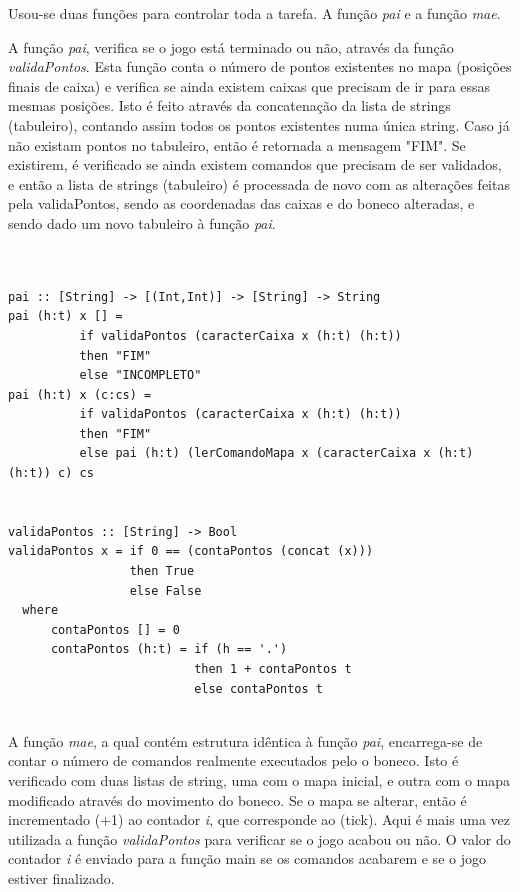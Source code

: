 \documentclass[a4paper]{article}
\begin{document}
Usou-se duas funções para controlar toda a tarefa. A função \textit{pai} e a função \textit{mae}. \par
A função \textit{pai}, verifica se o jogo está terminado ou não, através da função \textit{validaPontos}. Esta função conta o número de pontos existentes no mapa (posições finais de caixa) e verifica se ainda existem caixas que precisam de ir para essas mesmas posições. Isto é feito através da concatenação da lista de strings (tabuleiro), contando assim todos os pontos existentes numa única string. Caso já não existam pontos no tabuleiro, então é retornada a mensagem "FIM". Se existirem, é verificado se ainda existem comandos que precisam de ser validados, e então a lista de strings (tabuleiro) é processada de novo com as alterações feitas pela validaPontos, sendo as coordenadas das caixas e do boneco alteradas, e sendo dado um novo tabuleiro à função \textit{pai}. \par


\begin{Verbatim}


pai :: [String] -> [(Int,Int)] -> [String] -> String 
pai (h:t) x [] = 
          if validaPontos (caracterCaixa x (h:t) (h:t)) 
          then "FIM" 
          else "INCOMPLETO"      
pai (h:t) x (c:cs) = 
          if validaPontos (caracterCaixa x (h:t) (h:t))  
          then "FIM"
          else pai (h:t) (lerComandoMapa x (caracterCaixa x (h:t) (h:t)) c) cs
                     

validaPontos :: [String] -> Bool
validaPontos x = if 0 == (contaPontos (concat (x))) 
                 then True 
                 else False 
  where
      contaPontos [] = 0
      contaPontos (h:t) = if (h == '.')
                          then 1 + contaPontos t
                          else contaPontos t 


\end{Verbatim}


A função \textit{mae}, a qual contém estrutura idêntica à função \textit{pai}, encarrega-se de contar o número de comandos realmente executados pelo o boneco. Isto é verificado com duas listas de string, uma com o mapa inicial, e outra com o mapa modificado através do movimento do boneco. Se o mapa se alterar, então é incrementado (+1) ao contador \textit{i}, que corresponde ao (tick). Aqui é mais uma vez utilizada a função \textit{validaPontos} para verificar se o jogo acabou ou não. O valor do contador \textit{i} é enviado para a função main se os comandos acabarem e se o jogo estiver finalizado. \par
\end{document}
